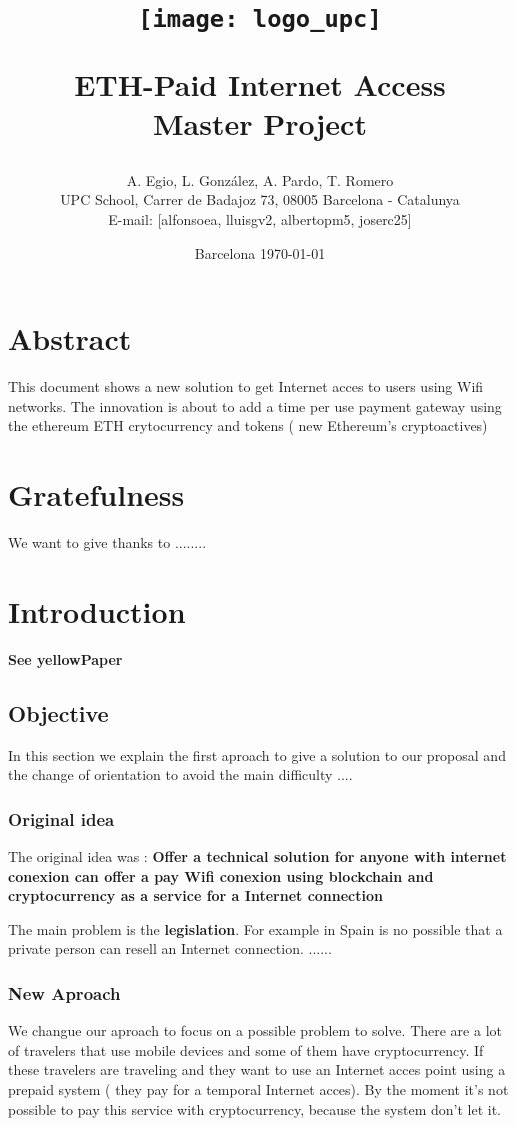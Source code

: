 \documentclass[12pt]{report}
\title{
	\begin{figure}
		\texttt{[image: logo\_upc]}
		\raggedleft
		\vspace{2.5cm}
	\end{figure}
  \textbf{ETH-Paid Internet Access} \\
  Master Project
}
\author{
  A. Egio, L. Gonz\'alez, A. Pardo, T. Romero\\
  UPC School, Carrer de Badajoz 73, 08005 Barcelona - Catalunya\\
  E-mail: [alfonsoea, lluisgv2, albertopm5, joserc25]\\
}
\date{Barcelona   \today}
\begin{document}
  \maketitle

  \tableofcontents

  \chapter*{Abstract}
  This document shows a new solution to get Internet acces to users using Wifi networks. The innovation is about to add a time per use payment gateway using the ethereum ETH crytocurrency and tokens ( new Ethereum's cryptoactives)

  \chapter*{Gratefulness}
  We want to give thanks to ........

  \chapter{Introduction} \label{sec:introduction}
  \textbf{ See yellowPaper}

  \section{Objective} \label{ch:objective}
  In this section we explain the first aproach to give a solution to our proposal and the change of orientation to avoid the main difficulty
	....
	\subsection{Original idea} \label{ch:original-idea}

  The original idea was :
  \textbf{Offer a technical solution for anyone with internet conexion can offer a pay Wifi conexion using blockchain and cryptocurrency as a service for a Internet connection}

  The main problem is the \textbf{legislation}. For example in Spain is no possible that a private person can resell an Internet connection.
	......
	\subsection{New Aproach} \label{ch:new-aproach}
  We changue our aproach to focus on a possible problem to solve. There are a lot of travelers that use mobile devices and some of them have cryptocurrency.   If these travelers are traveling and they want to use an Internet acces point using a prepaid system ( they pay for a temporal Internet acces). By the moment it's not possible to pay this service with cryptocurrency, because the system don't let it.
\end{document}
